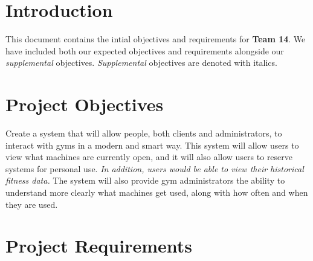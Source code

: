 \documentclass[letterpaper,11pt]{./templates/texMemo} %
\begin{document}
\maketitle

\section{Introduction}

This document contains the intial objectives and requirements for \textbf{Team 14}. We have included both our expected objectives and requirements alongside our \textit{supplemental} objectives. \textit{Supplemental} objectives are denoted with italics.  


\section{Project Objectives}

Create a system that will allow people, both clients and administrators, to interact with gyms in a modern and smart way.
This system will allow users to view what machines are currently open, 
    and it will also allow users to reserve systems for personal use. 
\textit{In addition, users would be able to view their historical fitness data.}
The system will also provide gym administrators the ability to understand more clearly what machines get used,
    along with how often and when they are used.

\section{Project Requirements}
\end{document}
